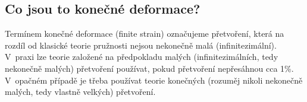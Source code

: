 
\subsection{Co jsou to konečné deformace?}
Termínem konečné deformace (finite strain) označujeme přetvoření, která na rozdíl od klasické teorie pružnosti nejsou nekonečně malá (infinitezimální).
V~praxi lze teorie založené na předpokladu malých (infinitezimálních, tedy nekonečně malých) přetvoření používat, pokud přetvoření nepřesáhnou cca 1\%.
V~opačném případě je třeba používat teorie konečných (rozuměj nikoli nekonečně malých, tedy vlastně velkých) přetvoření.
